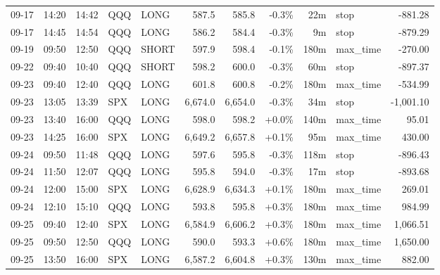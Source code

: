 \documentclass[11pt,a4paper,twoside]{article}
\begin{document}
\begin{center}
\begin{longtable}{>{\color{txtmain}}l l l l l r r r r >{\color{txtmain}}l r}
09-17 & 14:20 & 14:42 & QQQ & LONG & 587.5 & 585.8 & \textcolor{lossred}{-0.3\%} & 22m & stop & \textcolor{lossred}{-881.28} \\
09-17 & 14:45 & 14:54 & QQQ & LONG & 586.2 & 584.4 & \textcolor{lossred}{-0.3\%} & 9m & stop & \textcolor{lossred}{-879.29} \\
09-19 & 09:50 & 12:50 & QQQ & SHORT & 597.9 & 598.4 & \textcolor{lossred}{-0.1\%} & 180m & max\_time & \textcolor{lossred}{-270.00} \\
09-22 & 09:40 & 10:40 & QQQ & SHORT & 598.2 & 600.0 & \textcolor{lossred}{-0.3\%} & 60m & stop & \textcolor{lossred}{-897.37} \\
09-23 & 09:40 & 12:40 & QQQ & LONG & 601.8 & 600.8 & \textcolor{lossred}{-0.2\%} & 180m & max\_time & \textcolor{lossred}{-534.99} \\
09-23 & 13:05 & 13:39 & SPX & LONG & 6,674.0 & 6,654.0 & \textcolor{lossred}{-0.3\%} & 34m & stop & \textcolor{lossred}{-1,001.10} \\
09-23 & 13:40 & 16:00 & QQQ & LONG & 598.0 & 598.2 & \textcolor{wingreen}{+0.0\%} & 140m & max\_time & \textcolor{wingreen}{95.01} \\
09-23 & 14:25 & 16:00 & SPX & LONG & 6,649.2 & 6,657.8 & \textcolor{wingreen}{+0.1\%} & 95m & max\_time & \textcolor{wingreen}{430.00} \\
09-24 & 09:50 & 11:48 & QQQ & LONG & 597.6 & 595.8 & \textcolor{lossred}{-0.3\%} & 118m & stop & \textcolor{lossred}{-896.43} \\
09-24 & 11:50 & 12:07 & QQQ & LONG & 595.8 & 594.0 & \textcolor{lossred}{-0.3\%} & 17m & stop & \textcolor{lossred}{-893.68} \\
09-24 & 12:00 & 15:00 & SPX & LONG & 6,628.9 & 6,634.3 & \textcolor{wingreen}{+0.1\%} & 180m & max\_time & \textcolor{wingreen}{269.01} \\
09-24 & 12:10 & 15:10 & QQQ & LONG & 593.8 & 595.8 & \textcolor{wingreen}{+0.3\%} & 180m & max\_time & \textcolor{wingreen}{984.99} \\
09-25 & 09:40 & 12:40 & SPX & LONG & 6,584.9 & 6,606.2 & \textcolor{wingreen}{+0.3\%} & 180m & max\_time & \textcolor{wingreen}{1,066.51} \\
09-25 & 09:50 & 12:50 & QQQ & LONG & 590.0 & 593.3 & \textcolor{wingreen}{+0.6\%} & 180m & max\_time & \textcolor{wingreen}{1,650.00} \\
09-25 & 13:50 & 16:00 & SPX & LONG & 6,587.2 & 6,604.8 & \textcolor{wingreen}{+0.3\%} & 130m & max\_time & \textcolor{wingreen}{882.00} \\

\end{longtable}
\end{center}
\end{document}
